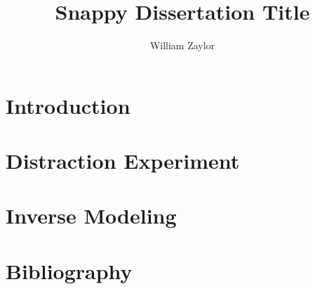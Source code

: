 \documentclass{report}
\author{William Zaylor}
\title{Snappy Dissertation Title}
\begin{document}
\maketitle

\chapter{Introduction}


\chapter{Distraction Experiment}


\chapter{Inverse Modeling}


\chapter{Bibliography}

\end{document}
